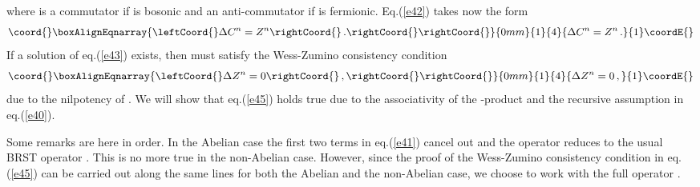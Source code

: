 \documentclass[a4paper,12pt]{article}
\begin{document}
%
where \myHighlight{$[ c, X \}$}\coordHE{} is a commutator if \coordHE{} is bosonic and
 an anti-commutator if \coordHE{} is fermionic.
Eq.(\ref{e42}) takes now the form
%
\begin{eqnarray}\coord{}\boxAlignEqnarray{\leftCoord{}
\Delta C^n = Z^n \rightCoord{}\, . \rightCoord{}
\label{e44}
\rightCoord{}}{0mm}{1}{4}{
\Delta C^n = Z^n \, . 
}{1}\coordE{}\end{eqnarray}
%
If a solution \coordHE{} of eq.(\ref{e43}) exists, then \coordHE{} must satisfy
 the Wess-Zumino consistency condition
%
\begin{eqnarray}\coord{}\boxAlignEqnarray{\leftCoord{}
\Delta Z^n = 0\rightCoord{}\, , \rightCoord{}
\label{e45}
\rightCoord{}}{0mm}{1}{4}{
\Delta Z^n = 0\, , 
}{1}\coordE{}\end{eqnarray}
%
due to the nilpotency of \myHighlight{$\Delta$}\coordHE{}.
We will show that eq.(\ref{e45}) holds true due to the associativity
 of the \myHighlight{$\star$}\coordHE{}-product and the recursive assumption in eq.(\ref{e40}).

Some remarks are here in order. In the Abelian case the first two terms in 
 eq.(\ref{e41}) cancel out and the operator \myHighlight{$\Delta$}\coordHE{} reduces to the usual
 BRST operator \coordHE{}.
This is no more true in the non-Abelian case.
However, since the proof of the Wess-Zumino consistency condition 
 in eq.(\ref{e45}) can be carried out along the same lines for both
 the Abelian and the non-Abelian case, we choose to work with the full
 operator \myHighlight{$\Delta$}\coordHE{}.
\end{document}

